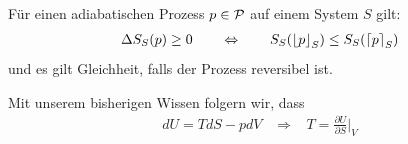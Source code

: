 \begin{theorem}[Entropiesatz]
    Für einen adiabatischen Prozess $p \in \P$ auf einem
    System $S$ gilt:
    \begin{align*}
        \Delta S_S (p) \geq 0
        \hspace{20pt} \Leftrightarrow \hspace{20pt}
        S_S(\floor{p}_S) \leq S_S(\ceil{p}_S)
    \end{align*}
    und es gilt Gleichheit, falls der Prozess reversibel ist.
\end{theorem}

\begin{bemerkung}
    Mit unserem bisherigen Wissen folgern wir, dass
    \begin{align*}
        dU = T dS - p dV
        \hspace{10pt} \Rightarrow \hspace{10pt}
        T = \frac{\partial U}{\partial S} \Big|_V
    \end{align*}
\end{bemerkung}
